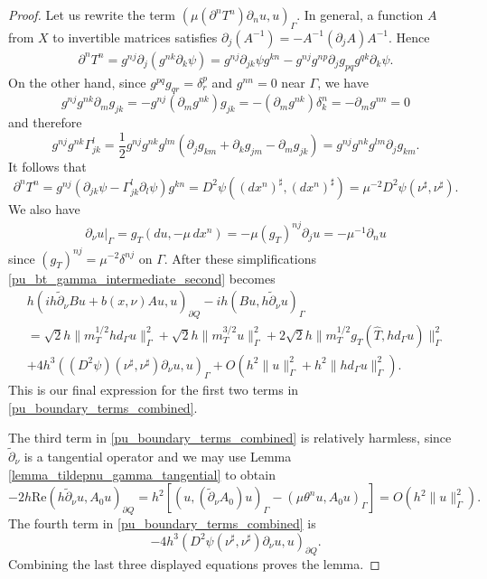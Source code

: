 \documentclass[11pt,letterpaper]{amsart}
\theoremstyle{definition}
\numberwithin{equation}{section}
\newcommand{\norm}[1]{\lVert #1 \rVert}         %
\newcommand{\p}{\partial}
\def\p{\partial}
\begin{document}
\begin{proof}
Let us rewrite the term $(\mu (\p^n T^n) \p_n u, u)_{\Gamma}$. In general, a function $A$ from $X$ to invertible matrices satisfies $\p_j(A^{-1}) = -A^{-1} (\p_j A) A^{-1}$. Hence  
\begin{align*}
\p^n T^n = g^{nj} \p_j(g^{nk} \p_k \psi) = g^{nj} \p_{jk} \psi g^{kn} - g^{nj} g^{np} \p_j g_{pq} g^{qk} \p_k \psi.
\end{align*}
On the other hand, since $g^{pq} g_{qr} = \delta^p_r$ and $g^{nn} = 0$ near $\Gamma$, we have  
\[
g^{nj} g^{nk} \p_m g_{jk} = -g^{nj} (\p_m g^{nk}) g_{jk} = -(\p_m g^{nk}) \delta^n_k = -\p_m g^{nn} = 0
\]
and therefore 
\[
g^{nj} g^{nk} \Gamma_{jk}^l = \frac{1}{2} g^{nj} g^{nk} g^{lm} (\p_j g_{km} + \p_k g_{jm} - \p_m g_{jk}) = g^{nj} g^{nk} g^{lm} \p_j g_{km}.
\]
It follows that 
\[
\p^n T^n = g^{nj} (\p_{jk} \psi - \Gamma_{jk}^l \p_l \psi) g^{kn} = D^2 \psi((dx^n)^{\sharp}, (dx^n)^{\sharp}) = \mu^{-2} D^2 \psi(\nu^{\sharp}, \nu^{\sharp}).
\]
We also have 
\begin{align*}
\p_{\nu} u|_{\Gamma} = g_T(du, -\mu \,dx^n) = -\mu (g_T)^{nj} \p_j u = - \mu^{-1} \p_n u
\end{align*}
since $(g_T)^{nj} = \mu^{-2} \delta^{nj}$ on $\Gamma$. After these simplifications \eqref{pu_bt_gamma_intermediate_second} becomes 
\begin{multline*}
h (i h\tilde{\p}_{\nu} Bu + b(x,\nu) Au, u)_{\p Q}  -ih(Bu, h \tilde{\p}_{\nu} u)_{\Gamma} \\
 = \sqrt{2} h \norm{m_T^{1/2} h d_{\Gamma} u}_{\Gamma}^2 + \sqrt{2} h \norm{m_T^{3/2} u}_{\Gamma}^2 + 2 \sqrt{2} h \norm{m_T^{1/2} g_T(\hat{T}, hd_{\Gamma} u)}_{\Gamma}^2  \\
  + 4 h^3 ((D^2 \psi)(\nu^{\sharp}, \nu^{\sharp}) \p_{\nu} u, u)_{\Gamma} + O(h^2  \norm{u}_{\Gamma}^2 + h^2 \norm{hd_{\Gamma} u}_{\Gamma}^2).
\end{multline*}
This is our final expression for the first two terms in \eqref{pu_boundary_terms_combined}.

The third term in \eqref{pu_boundary_terms_combined} is relatively harmless, since $\tilde{\p}_{\nu}$ is a tangential operator and we may use Lemma \ref{lemma_tildepnu_gamma_tangential} to obtain 
\[
- 2 h \mathrm{Re}( h \tilde{\p}_{\nu} u, A_0 u)_{\p Q} = h^2 \left[ ( u, (\tilde{\p}_{\nu} A_0)u )_{\Gamma} - (\mu \theta^n u, A_0 u)_{\Gamma} \right] = O(h^2 \norm{u}_{\Gamma}^2 ).
\]
The fourth term in \eqref{pu_boundary_terms_combined} is 
\[
- 4 h^3 (D^2 \psi(\nu^{\sharp}, \nu^{\sharp}) \p_{\nu} u, u)_{\p Q}.
\]
Combining the last three displayed equations proves the lemma.
\end{proof}
\end{document}
